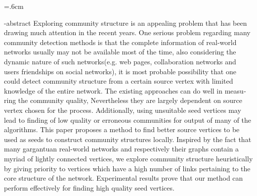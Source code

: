 
\baselineskip=.6cm
\begin{latin}
\en-abstract{
Exploring community structure is an appealing problem that has been 
drawing much attention in the recent years. One serious problem regarding 
many community detection methods is that the complete information of real-world
networks usually may not be available most of the time, also considering the
dynamic nature of such networks(e.g. web pages, collaboration networks and
users friendships on social networks), it is most probable possibility that
one could detect community structure from a certain source vertex with limited
knowledge of the entire network. The existing approaches can do well in measuring
the community quality, Nevertheless they are largely dependent on source vertex
chosen for the process. Additionally, using unsuitable seed vertices may lead to
finding of low quality or erroneous communities for output of many of the algorithms.
This paper proposes a method to find better source vertices to be used as seeds to
construct community structures locally. Inspired by the fact that many gargantuan 
real-world networks and respectively their graphs contain a myriad of lightly
connected vertices, we explore community structure heuristically by giving
priority to vertices which have a high number of links pertaining to the
core structure of the network. Experimental results prove that our method
can perform effectively for finding high quality seed vertices.
}
\latinfirstPage
\end{latin}
